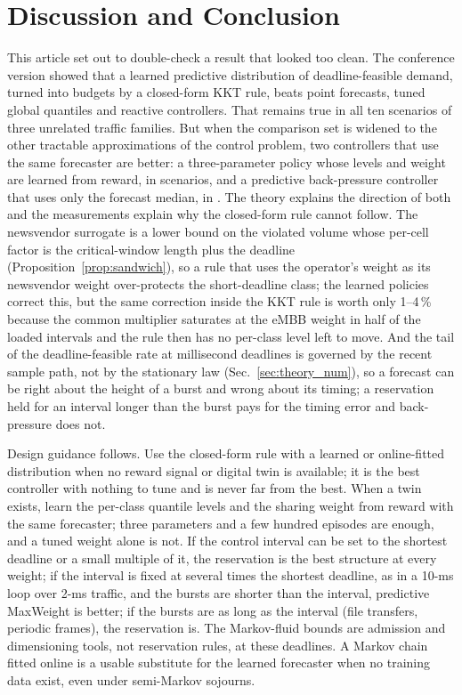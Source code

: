 \documentclass[journal]{IEEEtran}
\begin{document}
\section{Discussion and Conclusion}
\label{sec:conclusion}
This article set out to double-check a result that looked too clean. The conference version showed that a learned predictive distribution of deadline-feasible demand, turned into budgets by a closed-form KKT rule, beats point forecasts, tuned global quantiles and reactive controllers. That remains true in all ten scenarios of three unrelated traffic families. But when the comparison set is widened to the other tractable approximations of the control problem, two controllers that use the same forecaster are better: a three-parameter policy whose levels and weight are learned from reward, in \xwinscempolicy{} scenarios, and a predictive back-pressure controller that uses only the forecast median, in \xwinspredmaxweight{}. The theory explains the direction of both and the measurements explain why the closed-form rule cannot follow. The newsvendor surrogate is a lower bound on the violated volume whose per-cell factor is the critical-window length plus the deadline (Proposition~\ref{prop:sandwich}), so a rule that uses the operator's weight as its newsvendor weight over-protects the short-deadline class; the learned policies correct this, but the same correction inside the KKT rule is worth only 1--4\,\% because the common multiplier saturates at the eMBB weight in half of the loaded intervals and the rule then has no per-class level left to move. And the tail of the deadline-feasible rate at millisecond deadlines is governed by the recent sample path, not by the stationary law (Sec.~\ref{sec:theory_num}), so a forecast can be right about the height of a burst and wrong about its timing; a reservation held for an interval longer than the burst pays for the timing error and back-pressure does not.

Design guidance follows. Use the closed-form rule with a learned or online-fitted distribution when no reward signal or digital twin is available; it is the best controller with nothing to tune and is never far from the best. When a twin exists, learn the per-class quantile levels and the sharing weight from reward with the same forecaster; three parameters and a few hundred episodes are enough, and a tuned weight alone is not. If the control interval can be set to the shortest deadline or a small multiple of it, the reservation is the best structure at every weight; if the interval is fixed at several times the shortest deadline, as in a 10-ms loop over 2-ms traffic, and the bursts are shorter than the interval, predictive MaxWeight is better; if the bursts are as long as the interval (file transfers, periodic frames), the reservation is. The Markov-fluid bounds are admission and dimensioning tools, not reservation rules, at these deadlines. A Markov chain fitted online is a usable substitute for the learned forecaster when no training data exist, even under semi-Markov sojourns.
\end{document}
